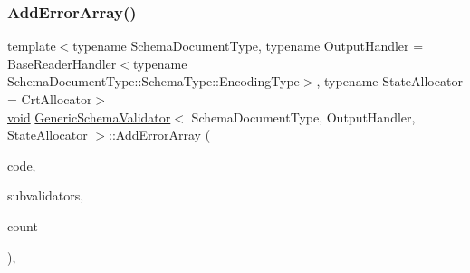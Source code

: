 \mbox{\label{classGenericSchemaValidator_aeaad9469f70e135ac75983e796818970}} 
\subsubsection{\texorpdfstring{Add\+Error\+Array()}{AddErrorArray()}}
{\footnotesize\ttfamily template$<$typename Schema\+Document\+Type, typename Output\+Handler = Base\+Reader\+Handler$<$typename Schema\+Document\+Type\+::\+Schema\+Type\+::\+Encoding\+Type$>$, typename State\+Allocator = Crt\+Allocator$>$ \\
\hyperlink{imgui__impl__opengl3__loader_8h_ac668e7cffd9e2e9cfee428b9b2f34fa7}{void} \hyperlink{classGenericSchemaValidator}{Generic\+Schema\+Validator}$<$ Schema\+Document\+Type, Output\+Handler, State\+Allocator $>$\+::Add\+Error\+Array (\begin{DoxyParamCaption}\item[{const \hyperlink{group__RAPIDJSON__ERRORS_ga2e1f88f94a5d9a6817a5de0ed2f0105a}{Validate\+Error\+Code}}]{code,  }\item[{I\+Schema\+Validator $\ast$$\ast$}]{subvalidators,  }\item[{\hyperlink{rapidjson_8h_a5ed6e6e67250fadbd041127e6386dcb5}{Size\+Type}}]{count }\end{DoxyParamCaption})\hspace{0.3cm}{\ttfamily [inline]}, {\ttfamily [private]}}

\mbox{\label{classGenericSchemaValidator_a437bd3210074af1b0df90b72e15e9b7e}} 
